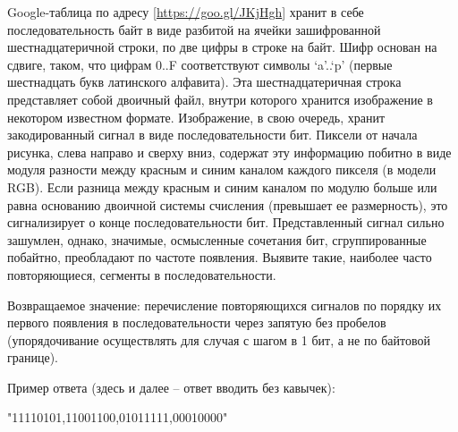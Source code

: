 
Google-таблица по адресу [\url{https://goo.gl/JKjHgh}] хранит в себе последовательность байт в виде разбитой на ячейки зашифрованной шестнадцатеричной строки, по две цифры в строке на байт. Шифр основан на сдвиге, таком, что цифрам 0..F соответствуют символы ‘a’..‘p’ (первые шестнадцать букв латинского алфавита). Эта шестнадцатеричная строка представляет собой двоичный файл, внутри которого хранится изображение в некотором известном формате. Изображение, в свою очередь, хранит закодированный сигнал в виде последовательности бит. Пиксели от начала рисунка, слева направо и сверху вниз, содержат эту информацию побитно в виде модуля разности между красным и синим каналом каждого пикселя (в модели RGB). Если разница между красным и синим каналом по модулю больше или равна основанию двоичной системы счисления (превышает ее размерность), это сигнализирует о конце последовательности бит. Представленный сигнал сильно зашумлен, однако, значимые, осмысленные сочетания бит, сгруппированные побайтно, преобладают по частоте появления. Выявите такие, наиболее часто повторяющиеся, сегменты в последовательности. 

Возвращаемое значение: перечисление повторяющихся сигналов по порядку их первого появления в последовательности через запятую без пробелов (упорядочивание осуществлять для случая с шагом в 1 бит, а не по байтовой границе).

Пример ответа (здесь и далее – ответ вводить без кавычек): 

"11110101,11001100,01011111,00010000"


